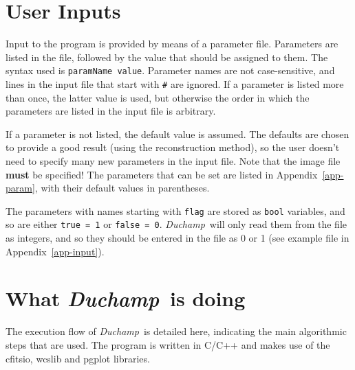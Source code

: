 \documentclass[12pt,a4paper]{article}
\newcommand{\duchamp}{\emph{Duchamp}}
\begin{document}
\section{User Inputs}
\label{sec-param}

Input to the program is provided by means of a parameter
file. Parameters are listed in the file, followed by the value that
should be assigned to them. The syntax used is \texttt{paramName
value}. Parameter names are not case-sensitive, and lines in the input
file that start with \texttt{\#} are ignored. If a parameter is listed
more than once, the latter value is used, but otherwise the order in
which the parameters are listed in the input file is arbitrary.

If a parameter is not listed, the default value is assumed. The
defaults are chosen to provide a good result (using the reconstruction
method), so the user doesn't need to specify many new parameters in
the input file. Note that the image file \textbf{must} be specified! The
parameters that can be set are listed in Appendix~\ref{app-param},
with their default values in parentheses.

The parameters with names starting with \texttt{flag} are stored as
\texttt{bool} variables, and so are either \texttt{true = 1} or
\texttt{false = 0}. \duchamp\ will only read them from the file as
integers, and so they should be entered in the file as 0 or 1 (see
example file in Appendix~\ref{app-input}).

\section{What \duchamp\ is doing}
\label{sec-flow}

The execution flow of \duchamp\ is detailed here, indicating the
main algorithmic steps that are used. The program is written in C/C++
and makes use of the {\sc cfitsio}, {\sc wcslib} and {\sc pgplot}
libraries. 

%
\end{document}
